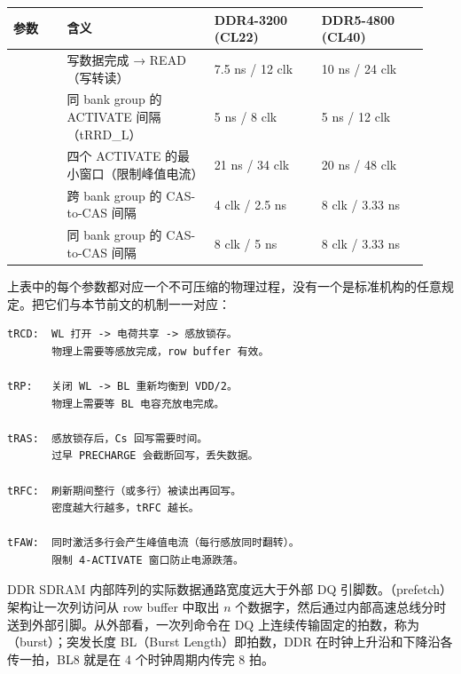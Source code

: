 \begin{longtable}{L{0.12\linewidth}L{0.33\linewidth}L{0.24\linewidth}L{0.24\linewidth}}
\toprule
参数 & 含义 & DDR4-3200 (CL22) & DDR5-4800 (CL40) \\
\midrule
{} & 写数据完成 → READ（写转读） & 7.5 ns / 12 clk & 10 ns / 24 clk \\\tablerowrule
{} & 同 bank group 的 ACTIVATE 间隔（tRRD\_L） & 5 ns / 8 clk & 5 ns / 12 clk \\\tablerowrule
{} & 四个 ACTIVATE 的最小窗口（限制峰值电流） & 21 ns / 34 clk & 20 ns / 48 clk \\\tablerowrule
{} & 跨 bank group 的 CAS-to-CAS 间隔 & 4 clk / 2.5 ns & 8 clk / 3.33 ns \\\tablerowrule
{} & 同 bank group 的 CAS-to-CAS 间隔 & 8 clk / 5 ns & 8 clk / 3.33 ns \\
\bottomrule
\end{longtable}



上表中的每个参数都对应一个不可压缩的物理过程，没有一个是标准机构的任意规定。把它们与本节前文的机制一一对应：

\begin{lstlisting}[numbers=none,caption={为什么需要这些等待}]
tRCD:  WL 打开 -> 电荷共享 -> 感放锁存。
       物理上需要等感放完成，row buffer 有效。

tRP:   关闭 WL -> BL 重新均衡到 VDD/2。
       物理上需要等 BL 电容充放电完成。

tRAS:  感放锁存后，Cs 回写需要时间。
       过早 PRECHARGE 会截断回写，丢失数据。

tRFC:  刷新期间整行（或多行）被读出再回写。
       密度越大行越多，tRFC 越长。

tFAW:  同时激活多行会产生峰值电流（每行感放同时翻转）。
       限制 4-ACTIVATE 窗口防止电源跌落。
\end{lstlisting}


DDR SDRAM 内部阵列的实际数据通路宽度远大于外部 DQ 引脚数。（prefetch）架构让一次列访问从 row buffer 中取出 $n$ 个数据字，然后通过内部高速总线分时送到外部引脚。从外部看，一次列命令在 DQ 上连续传输固定的拍数，称为（burst）；突发长度 BL（Burst Length）即拍数，DDR 在时钟上升沿和下降沿各传一拍，BL8 就是在 4 个时钟周期内传完 8 拍。

